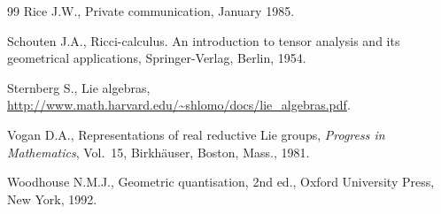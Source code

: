 \documentclass[pdftex]{sigma}
\begin{document}
\begin{thebibliography}{99}
Rice J.W.,
Private communication, January 1985.

Schouten J.A.,
Ricci-calculus. An introduction to tensor analysis and its geometrical applications,
Springer-Verlag, Berlin, 1954.

Sternberg S., Lie algebras,
\url{http://www.math.harvard.edu/~shlomo/docs/lie_algebras.pdf}.



Vogan D.A.,
Representations of real reductive Lie groups,
{\it Progress in Mathematics}, Vol.~15, Birkh\"auser, Boston, Mass., 1981.

Woodhouse N.M.J.,
Geometric quantisation,
2nd ed., Oxford University Press, New York, 1992.

\end{thebibliography} \LastPageEnding
\end{document}
